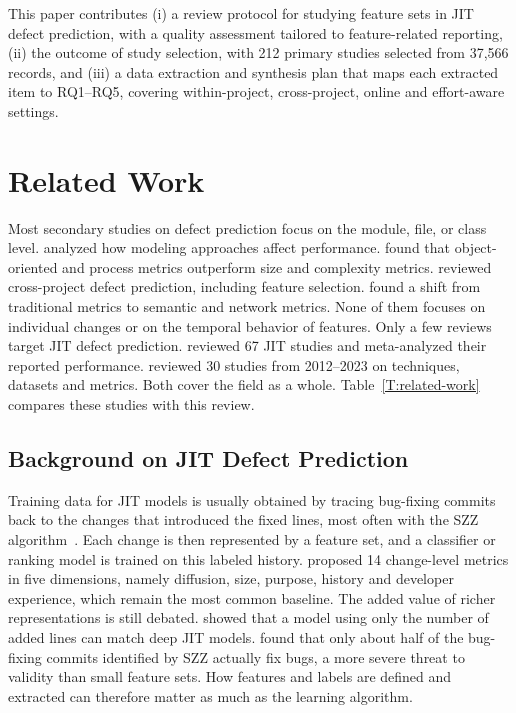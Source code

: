 \documentclass[sigconf,review]{acmart}
\begin{document}
\noindent This paper contributes (i) a review protocol for studying feature sets in JIT defect prediction, with a quality assessment tailored to feature-related reporting, (ii) the outcome of study selection, with 212 primary studies selected from 37,566 records, and (iii) a data extraction and synthesis plan that maps each extracted item to RQ1--RQ5, covering within-project, cross-project, online and effort-aware settings.

\section{Related Work}
\label{S:related-works}

Most secondary studies on defect prediction focus on the module, file, or class level. \citet{hall2012systematic} analyzed how modeling approaches affect performance. \citet{radjenovic2013software} found that object-oriented and process metrics outperform size and complexity metrics. \citet{pal2022cross} reviewed cross-project defect prediction, including feature selection. \citet{qiu2025survey} found a shift from traditional metrics to semantic and network metrics. None of them focuses on individual changes or on the temporal behavior of features. Only a few reviews target JIT defect prediction. \citet{zhao2023systematic} reviewed 67 JIT studies and meta-analyzed their reported performance. \citet{alnagi2024just} reviewed 30 studies from 2012--2023 on techniques, datasets and metrics. Both cover the field as a whole. Table~\ref{T:related-work} compares these studies with this review.

\subsection{Background on JIT Defect Prediction}
\label{SS:rw-background}

Training data for JIT models is usually obtained by tracing bug-fixing commits back to the changes that introduced the fixed lines, most often with the SZZ algorithm~\cite{sliwerski2005changes}. Each change is then represented by a feature set, and a classifier or ranking model is trained on this labeled history. \citet{kamei2013large} proposed 14 change-level metrics in five dimensions, namely diffusion, size, purpose, history and developer experience, which remain the most common baseline. The added value of richer representations is still debated. \citet{zeng2021deep} showed that a model using only the number of added lines can match deep JIT models. \citet{herbold2022problems} found that only about half of the bug-fixing commits identified by SZZ actually fix bugs, a more severe threat to validity than small feature sets. How features and labels are defined and extracted can therefore matter as much as the learning algorithm.
\end{document}
